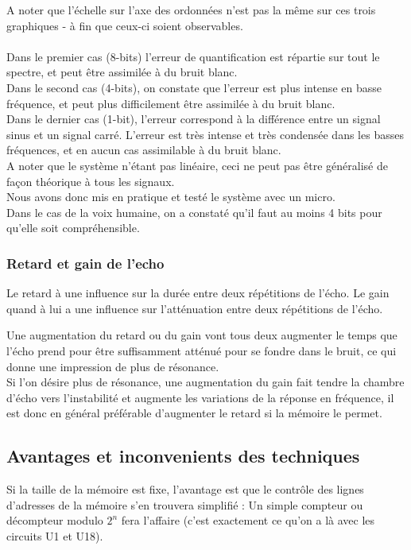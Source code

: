 \documentclass{article}
\begin{document}
A noter que l'échelle sur l'axe des ordonnées n'est pas la même sur ces trois graphiques - à fin que ceux-ci soient observables.\\
\\
Dans le premier cas (8-bits) l'erreur de quantification est répartie sur tout le spectre, et peut être assimilée à du bruit blanc.
\\
Dans le second cas (4-bits), on constate que l'erreur est plus intense en basse fréquence, et peut plus difficilement être assimilée à du bruit blanc.
\\
Dans le dernier cas (1-bit), l'erreur correspond à la différence entre un signal sinus et un signal carré. L'erreur est très intense et très condensée dans les basses fréquences, et en aucun cas assimilable à du bruit blanc.
\\

A noter que le système n'étant pas linéaire, ceci ne peut pas être généralisé de façon théorique à tous les signaux.\\

Nous avons donc mis en pratique et testé le système avec un micro.\\
Dans le cas de la voix humaine, on a constaté qu'il faut au moins 4 bits pour qu'elle soit compréhensible.

\subsubsection{Retard et gain de l'echo}
Le retard à une influence sur la durée entre deux répétitions de l'écho.
Le gain quand à lui a une influence sur l'atténuation entre deux répétitions de l'écho.

Une augmentation du retard ou du gain vont tous deux augmenter le temps que l'écho prend pour être suffisamment atténué pour se fondre dans le bruit, ce qui donne une impression de plus de résonance.\\

Si l'on désire plus de résonance, une augmentation du gain fait tendre la chambre d'écho vers l'instabilité et augmente les variations de la réponse en fréquence, il est donc en général préférable d'augmenter le retard si la mémoire le permet.

\subsection{Avantages et inconvenients des techniques}
Si la taille de la mémoire est fixe, l'avantage est que le contrôle des lignes d'adresses de la mémoire s'en trouvera simplifié : Un simple compteur ou décompteur modulo $2^n$ fera l'affaire (c'est exactement ce qu'on a là avec les circuits U1 et U18).
\end{document}
